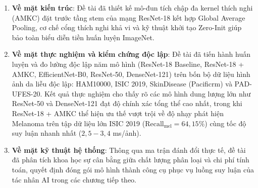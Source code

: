 \begin{enumerate}
  \item \textbf{Về mặt kiến trúc}: Đề tài đã thiết kế mô-đun tích chập đa kernel thích nghi (AMKC) đặt trước tầng stem của mạng ResNet-18 kết hợp Global Average Pooling, cơ chế cổng thích nghi khả vi và kỹ thuật khởi tạo Zero-Init giúp bảo toàn biểu diễn tiền huấn luyện ImageNet.
  \item \textbf{Về mặt thực nghiệm và kiểm chứng độc lập}: Đề tài đã tiến hành huấn luyện và đo lường độc lập năm mô hình (ResNet-18 Baseline, ResNet-18 + AMKC, EfficientNet-B0, ResNet-50, DenseNet-121) trên bốn bộ dữ liệu hình ảnh da liễu độc lập: HAM10000, ISIC 2019, SkinDisease (Pacificrm) và PAD-UFES-20. Kết quả thực nghiệm cho thấy rõ các mô hình dung lượng lớn như ResNet-50 và DenseNet-121 đạt độ chính xác tổng thể cao nhất, trong khi ResNet-18 + AMKC thể hiện ưu thế vượt trội về độ nhạy phát hiện Melanoma trên tập dữ liệu lớn ISIC 2019 ($\mathrm{Recall}_{\mathrm{mel}} = 64{,}15\%$) cùng tốc độ suy luận nhanh nhất ($2{,}5 - 3{,}4$ ms/ảnh).
  \item \textbf{Về mặt kỹ thuật hệ thống}: Thông qua ma trận đánh đổi thực tế, đề tài đã phân tích khoa học sự cân bằng giữa chất lượng phân loại và chi phí tính toán, quyết định đóng gói mô hình thành công cụ phục vụ luồng suy luận của tác nhân AI trong các chương tiếp theo.
\end{enumerate}
